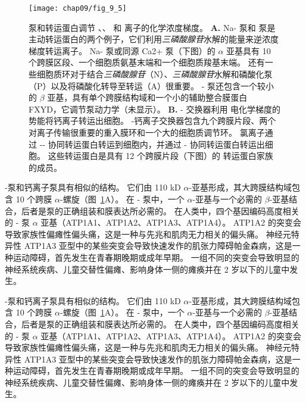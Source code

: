 \begin{figure}[htbp]
	\centering
	\texttt{[image: chap09/fig\_9\_5]}
	\caption{泵和转运蛋白调节 、、 和  离子的化学浓度梯度。
		\textbf{A.} Na- 泵和  泵是主动转运蛋白的两个例子，它们利用\textit{三磷酸腺苷}水解的能量来逆浓度梯度转运离子。
		Na- 泵或同源 Ca2+ 泵（下图）的 $\alpha$ 亚基具有 10 个跨膜区段、一个细胞质氨基末端和一个细胞质羧基末端。
		还有一些细胞质环对于结合\textit{三磷酸腺苷}（N）、\textit{三磷酸腺苷}水解和磷酸化泵（P）以及将磷酸化转导至转运（A）很重要。
		- 泵还包含一个较小的 $\beta$ 亚基，具有单个跨膜结构域和一个小的辅助整合膜蛋白 FXYD，它调节泵动力学（未显示）。
		\textbf{B.} - 交换器利用  电化学梯度的势能将钙离子转运出细胞。
		-钙离子交换器包含九个跨膜片段、两个对离子传输很重要的重入膜环和一个大的细胞质调节环。
		氯离子通过 -- 协同转运蛋白转运到细胞内，并通过 - 协同转运蛋白转运出细胞。
		这些转运蛋白是具有 12 个跨膜片段（下图）的  转运蛋白家族的成员。}
	\label{fig:9_5}
\end{figure}


-泵和钙离子泵具有相似的结构。
它们由 110 kD $\alpha$-亚基形成，其大跨膜结构域包含 10 个跨膜 $\alpha$-螺旋（图~\ref{fig:9_5}A）。
在 - 泵中，一个 $\alpha$-亚基与一个必需的 $\beta$-亚基结合，后者是泵的正确组装和膜表达所必需的。
在人类中，四个基因编码高度相关的 - 泵 $\alpha$ 亚基（ATP1A1、ATP1A2、ATP1A3、ATP1A4）。
ATP1A2 的突变会导致家族性偏瘫性偏头痛，这是一种与先兆和肌肉无力相关的偏头痛。
神经元特异性 ATP1A3 亚型中的某些突变会导致快速发作的肌张力障碍帕金森病，这是一种运动障碍，首先发生在青春期晚期或成年早期。
一组不同的突变会导致明显的神经系统疾病、儿童交替性偏瘫、影响身体一侧的瘫痪并在 2 岁以下的儿童中发生。


-泵和钙离子泵具有相似的结构。
它们由 110 kD $\alpha$-亚基形成，其大跨膜结构域包含 10 个跨膜 $\alpha$-螺旋（图~\ref{fig:9_5}A）。
在 - 泵中，一个 $\alpha$-亚基与一个必需的 $\beta$-亚基结合，后者是泵的正确组装和膜表达所必需的。
在人类中，四个基因编码高度相关的 - 泵 $\alpha$ 亚基（ATP1A1、ATP1A2、ATP1A3、ATP1A4）。
ATP1A2 的突变会导致家族性偏瘫性偏头痛，这是一种与先兆和肌肉无力相关的偏头痛。
神经元特异性 ATP1A3 亚型中的某些突变会导致快速发作的肌张力障碍帕金森病，这是一种运动障碍，首先发生在青春期晚期或成年早期。
一组不同的突变会导致明显的神经系统疾病、儿童交替性偏瘫、影响身体一侧的瘫痪并在 2 岁以下的儿童中发生。



